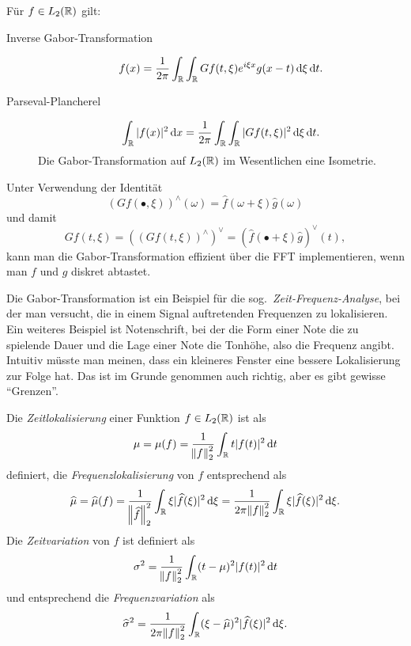 \begin{proposition}
Für $ f \in L_{2}(\mathbb{R}) $ gilt:
\begin{description}
\item [Inverse Gabor-Transformation]
  \[
    f(x) = \frac{1}{2\pi} \int_{\R} \int_{\R} Gf(t,\xi) e^{i \xi x} g(x - t) \dif \xi \dif t.
  \]
\item [Parseval-Plancherel]
  \[
    \int_{\R} |f(x)|^{2} \dif x = \frac{1}{2\pi} \int_{\R}\int_{\R} |Gf(t,\xi)|^{2} \dif \xi \dif t.
  \]
  Die Gabor-Transformation auf $ L_{2}(\mathbb{R}) $ im Wesentlichen eine Isometrie.
\end{description}
\end{proposition}

\begin{remark}
Unter Verwendung der Identität
\[
    (Gf(\bullet, \xi))^{\wedge}(\omega)
  = \widehat{f}(\omega + \xi)\widehat{g}(\omega)
\]
und damit
\[
    Gf(t, \xi)
  = \left( (Gf(t, \xi))^{\wedge} \right)^{\vee}
  = \left( \widehat{f}(\bullet + \xi) \widehat{g} \right)^{\vee}(t),
\]
kann man die Gabor-Transformation effizient über die FFT implementieren, wenn man $ f $ und $ g $
diskret abtastet.
\end{remark}

Die Gabor-Transformation ist ein Beispiel für die sog.\ \emph{Zeit-Frequenz-Analyse}, bei der man
versucht, die in einem Signal auftretenden Frequenzen zu lokalisieren. Ein weiteres Beispiel ist
Notenschrift, bei der die Form einer Note die zu spielende Dauer und die Lage einer Note die
Tonhöhe, also die Frequenz angibt. Intuitiv müsste man meinen, dass ein kleineres Fenster eine 
bessere Lokalisierung zur Folge hat. Das ist im Grunde genommen auch richtig, aber es gibt gewisse 
\enquote{Grenzen}.

\begin{definition}
Die \emph{Zeitlokalisierung} einer Funktion $ f \in L_{2}(\mathbb{R}) $ ist als
\[
  \mu = \mu(f) = \frac{1}{\norm{f}_{2}^{2}} \int_{\R} t |f(t)|^{2} \dif t
\]
definiert, die \emph{Frequenzlokalisierung} von $ f $ entsprechend als
\[
    \widehat{\mu} = \widehat{\mu}(f)
  = \frac{1}{\norm{\widehat{f}}_{2}^{2}} \int_{\R} \xi |\widehat{f}(\xi)|^{2} \dif \xi
  = \frac{1}{2\pi \norm{f}_{2}^{2}} \int_{\R} \xi |\widehat{f}(\xi)|^{2} \dif \xi.
\]
Die \emph{Zeitvariation} von $ f $ ist definiert als
\[
  \sigma^{2} = \frac{1}{\norm{f}_{2}^{2}} \int_{\R} (t - \mu)^{2} |f(t)|^{2} \dif t
\]
und entsprechend die \emph{Frequenzvariation} als
\[
    \widehat{\sigma}^{2}
  = \frac{1}{2\pi \norm{f}_{2}^{2}} 
      \int_{\R} (\xi - \widehat{\mu})^{2} |\widehat{f}(\xi)|^{2} \dif \xi.
\]
\end{definition}

